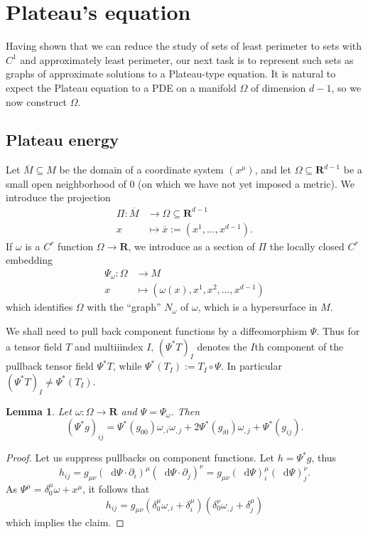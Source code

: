 \documentclass[reqno,12pt,letterpaper]{amsart}
\newcommand{\RR}{\mathbf{R}}
\newcommand*\dif{\mathop{}\!\mathrm{d}}
\newtheorem{lemma}[theorem]{Lemma}
\theoremstyle{definition}
\numberwithin{equation}{section}
\begin{document}

\section{Plateau's equation}\label{Plateau section}
Having shown that we can reduce the study of sets of least perimeter to sets with $C^1$ and approximately least perimeter, our next task is to represent such sets as graphs of approximate solutions to a Plateau-type equation.
It is natural to expect the Plateau equation to a PDE on a manifold $\Omega$ of dimension $d - 1$, so we now construct $\Omega$.

\subsection{Plateau energy}
Let $\overline M \subseteq M$ be the domain of a coordinate system $(x^\mu)$, and let $\Omega \subseteq \RR^{d - 1}$ be a small open neighborhood of $0$ (on which we have not yet imposed a metric).
We introduce the projection
\begin{align*}
    \Pi: \overline M &\to \Omega \subseteq \RR^{d - 1}\\
    x &\mapsto \overline x := (x^1, \dots, x^{d - 1}).
\end{align*}
If $\omega$ is a $C^r$ function $\Omega \to \RR$, we introduce as a section of $\Pi$ the locally closed $C^r$ embedding
\begin{align*}
    \Psi_\omega: \Omega &\to M \\
    x &\mapsto (\omega(x), x^1, x^2, \dots, x^{d - 1})
\end{align*}
which identifies $\Omega$ with the ``graph'' $N_\omega$ of $\omega$, which is a hypersurface in $M$.

We shall need to pull back component functions by a diffeomorphism $\Psi$. Thus for a tensor field $T$ and multiiindex $I$,
$(\Psi^* T)_I$ denotes the $I$th component of the pullback tensor field $\Psi^* T$, while $\Psi^* (T_I) := T_I \circ \Psi$.
In particular $(\Psi^* T)_I \neq \Psi^* (T_I)$.

\begin{lemma}\label{pullback metric to Omega}
Let $\omega: \Omega \to \RR$ and $\Psi = \Psi_\omega$. Then
$$(\Psi^* g)_{ij} = \Psi^* (g_{00}) \omega_{,i} \omega_{,j} + 2 \Psi^* (g_{i0}) \omega_{,j} + \Psi^* (g_{ij}).$$
\end{lemma}
\begin{proof}
Let us suppress pullbacks on component functions. Let $h = \Psi^* g$, thus 
$$h_{ij} = g_{\mu\nu} (\dif \Psi \cdot \partial_i)^\mu (\dif \Psi \cdot \partial_j)^\nu = g_{\mu\nu} (\dif \Psi)^\mu_i (\dif \Psi)^\nu_j.$$
As $\Psi^\mu = \delta^\mu_0 \omega + x^\mu$,
it follows that 
$$h_{ij} = g_{\mu\nu}(\delta^\mu_0 \omega_{,i} + \delta^\mu_i)(\delta^\nu_0 \omega_{,j} + \delta^\mu_j)$$
which implies the claim.
\end{proof}
\end{document}
